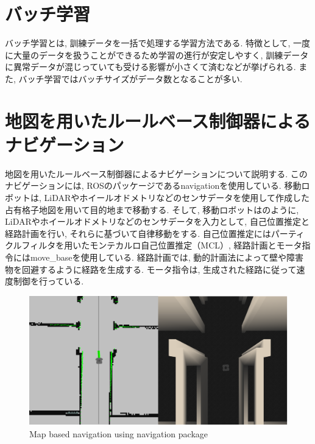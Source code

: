 \section{バッチ学習}
バッチ学習とは, 訓練データを一括で処理する学習方法である. 特徴として, 一度に大量のデータを扱うことができるため学習の進行が安定しやすく, 訓練データに異常データが混じっていても受ける影響が小さくて済むなどが挙げられる. また, バッチ学習ではバッチサイズがデータ数となることが多い. 

\section{地図を用いたルールベース制御器によるナビゲーション}
地図を用いたルールベース制御器によるナビゲーションについて説明する. このナビゲーションには, ROSのパッケージであるnavigation\cite{navigation}を使用している. 移動ロボットは, LiDARやホイールオドメトリなどのセンサデータを使用して作成した占有格子地図を用いて目的地まで移動する. そして, 移動ロボットはのように, LiDARやホイールオドメトリなどのセンサデータを入力として, 自己位置推定と経路計画を行い, それらに基づいて自律移動をする. 自己位置推定にはパーティクルフィルタを用いたモンテカルロ自己位置推定（MCL）\cite{mcl1}\cite{mcl2}, 経路計画とモータ指令にはmove\_base\cite{navigation}を使用している.  経路計画では, 動的計画法によって壁や障害物を回避するように経路を生成する. モータ指令は, 生成された経路に従って速度制御を行っている.


\begin{figure}[h]
     \centering
     \includegraphics[keepaspectratio, scale=0.3]
     {images/navigation.png}
     \caption{Map based navigation using navigation package}
     \label{Fig:navigation}
     \end{figure}